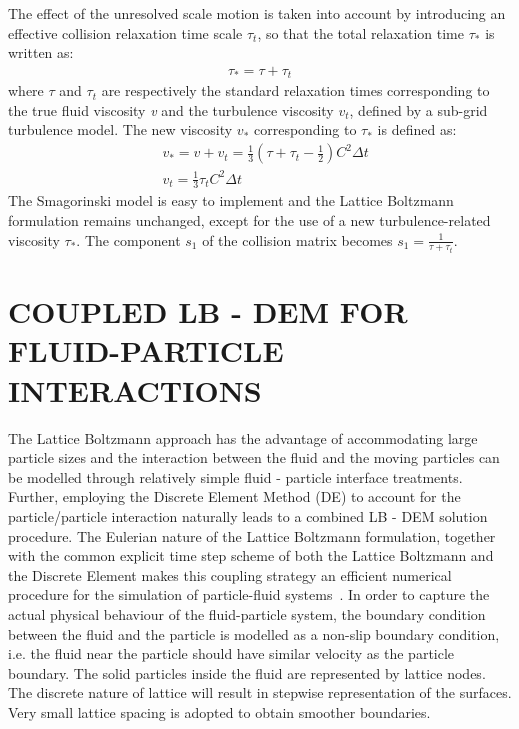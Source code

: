 \documentclass[12pt,a4paper,twocolumn,fleqn]{NARMS}
\begin{document}
The effect of the unresolved scale motion is taken into account by introducing an effective collision relaxation time scale $\tau_{t}$, so that the total relaxation time $\tau_{*}$ is written as:
\begin{align}
\tau_{*}=\tau + \tau_{t}
\end{align}
where $\tau$ and $\tau_{t}$ are respectively the standard relaxation times corresponding to the true fluid viscosity \textit{v} and the turbulence viscosity $\mathit{v}_{\mathit{t}}$, defined by a sub-grid turbulence model. The new viscosity $\mathit{v}_{*}$ corresponding to $\tau_{*}$ is defined as:
\begin{align}
& \mathit{v}_{*}=\mathit{v}+\mathit{v}_{\mathit{t}}=\frac{1}{3}(\tau+\tau_{t}-\frac{1}{2})\mathit{C}^{2} \Delta \mathit{t}  \\
& \mathit{v}_{\mathit{t}}=\frac{1}{3}\tau_{\mathit{t}}\mathit{C}^{2} \Delta \textit{t}
\end{align}
The Smagorinski model is easy to implement and the Lattice Boltzmann formulation remains unchanged, except for the use of a new turbulence-related viscosity $\tau_{*}$. The component $s_1$ of the collision matrix becomes $s_1 = \frac{1}{\tau+\tau_t}$.
\section{COUPLED LB - DEM FOR FLUID-PARTICLE INTERACTIONS}
The Lattice Boltzmann approach has the advantage of accommodating large particle sizes and the interaction between the fluid and the moving particles can be modelled through relatively simple fluid - particle interface treatments. Further, employing the Discrete Element Method (DE) to account for the particle/particle interaction naturally leads to a combined LB - DEM solution procedure. The Eulerian nature of the Lattice Boltzmann formulation, together with the common explicit time step scheme of both the Lattice Boltzmann and the Discrete Element makes this coupling strategy an efficient numerical procedure for the simulation of particle-fluid systems~. In order to capture the actual physical behaviour of the fluid-particle system, the boundary condition between the fluid and the particle is modelled as a non-slip boundary condition, i.e. the fluid near the particle should have similar velocity as the particle boundary. The solid particles inside the fluid are represented by lattice nodes. The discrete nature of lattice will result in stepwise representation of the surfaces. Very small lattice spacing is adopted to obtain smoother boundaries.
\end{document}
